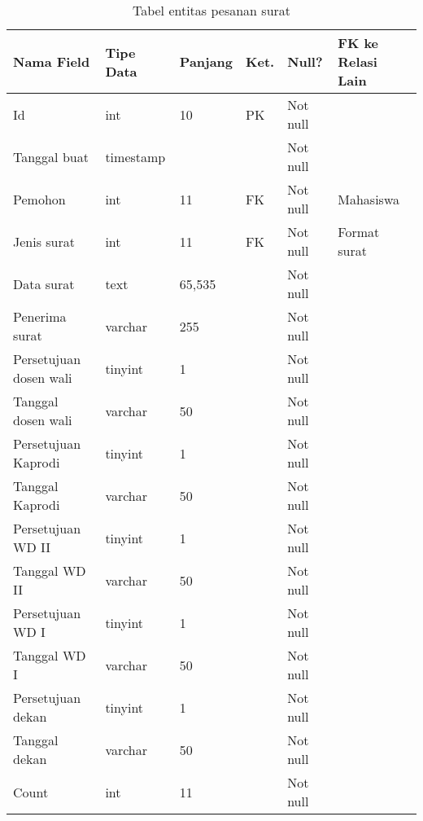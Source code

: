 \begin{table}[H]
\centering
\caption{Tabel entitas pesanan surat}
\label{entitas_pesanan_surat}
\begin{tabular}{|l|l|l|l|l|l|}
\hline
\textbf{Nama Field}&\textbf{Tipe Data}&\textbf{Panjang}&\textbf{Ket.}&\textbf{Null?}&\textbf{FK ke Relasi Lain}\\ \hline
Id&int&10&PK&Not null&\\ \hline
Tanggal buat&timestamp&&&Not null&\\ \hline
Pemohon&int&11&FK&Not null&Mahasiswa\\ \hline
Jenis surat&int&11&FK&Not null&Format surat\\ \hline
Data surat&text&65,535&&Not null&\\ \hline
Penerima surat&varchar&255&&Not null&\\ \hline
Persetujuan dosen wali&tinyint&1&&Not null&\\ \hline
Tanggal dosen wali&varchar&50&&Not null&\\ \hline
Persetujuan Kaprodi&tinyint&1&&Not null&\\ \hline
Tanggal Kaprodi&varchar&50&&Not null&\\ \hline
Persetujuan WD II&tinyint&1&&Not null&\\ \hline
Tanggal WD II&varchar&50&&Not null&\\ \hline
Persetujuan WD I&tinyint&1&&Not null&\\ \hline
Tanggal WD I&varchar&50&&Not null&\\ \hline
Persetujuan dekan&tinyint&1&&Not null&\\ \hline
Tanggal dekan&varchar&50&&Not null&\\ \hline
Count&int&11&&Not null&\\ \hline
\end{tabular}
\end{table}

